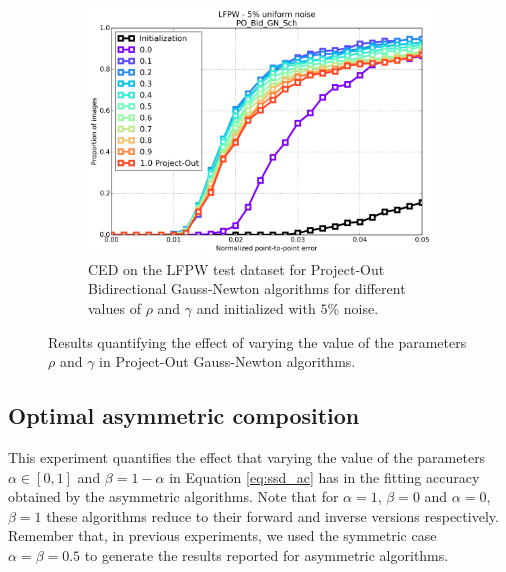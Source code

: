 \begin{figure}[h!]
	\begin{subfigure}{0.48\textwidth}
	    \includegraphics[width=\textwidth]{experiments/rho/ced_po_bid_gn_5.png}
	    \caption{CED on the LFPW test dataset for Project-Out Bidirectional Gauss-Newton algorithms for different values of $\rho$ and $\gamma$ and initialized with $5\%$ noise.}
	    \label{fig:ced_po_bid_gn}
	\end{subfigure}
	\caption{Results quantifying the effect of varying the value of the parameters $\rho$ and $\gamma$ in Project-Out Gauss-Newton algorithms.}
	\label{fig:rho}
\end{figure}



\subsection{Optimal asymmetric composition}

This experiment quantifies the effect that varying the value of the parameters $\alpha \in [0, 1]$ and $\beta = 1 -\alpha$ in Equation \ref{eq:ssd_ac} has in the fitting accuracy obtained by the asymmetric algorithms. Note that for $\alpha=1$, $\beta=0$ and $\alpha=0$, $\beta=1$ these algorithms reduce to their forward and inverse versions respectively. Remember that, in previous experiments, we used the symmetric case $\alpha=\beta=0.5$ to generate the results reported for asymmetric algorithms.

